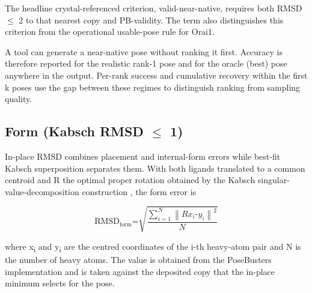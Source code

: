The headline crystal-referenced criterion, valid-near-native, requires both RMSD \ensuremath{\leq} 2\angstrom{} to that nearest copy and PB-validity. The term also distinguishes this criterion from the operational usable-pose rule for Orai1.

A tool can generate a near-native pose without ranking it first. Accuracy is therefore reported for the realistic rank-1 pose and for the oracle (best) pose anywhere in the output. Per-rank success and cumulative recovery within the first k poses use the gap between these regimes to distinguish ranking from sampling quality.


\hypertarget{form-kabsch-rmsd-1-uxe5}{%
\subsection{\texorpdfstring{Form (Kabsch RMSD \ensuremath{\leq} 1\angstrom{})}{Form (Kabsch RMSD <= 1 Angstrom)}}\label{form-kabsch-rmsd-1-uxe5}}

In-place RMSD combines placement and internal-form errors while best-fit Kabsch superposition separates them. With both ligands translated to a common centroid and R the optimal proper rotation obtained by the Kabsch singular-value-decomposition construction \cite{ref062}, the form error is

\[\text{RMSD}_{\text{form}}\text{=}\sqrt{\frac{\sum_{i = 1}^{N}\left\| Rx_{i}\text{-}y_{i} \right\|^{\text{2}}}{N}}\]

where x\textsubscript{i} and y\textsubscript{i} are the centred coordinates of the i-th heavy-atom pair and N is the number of heavy atoms. The value is obtained from the PoseBusters implementation \cite{ref035} and is taken against the deposited copy that the in-place minimum selects for the pose.

